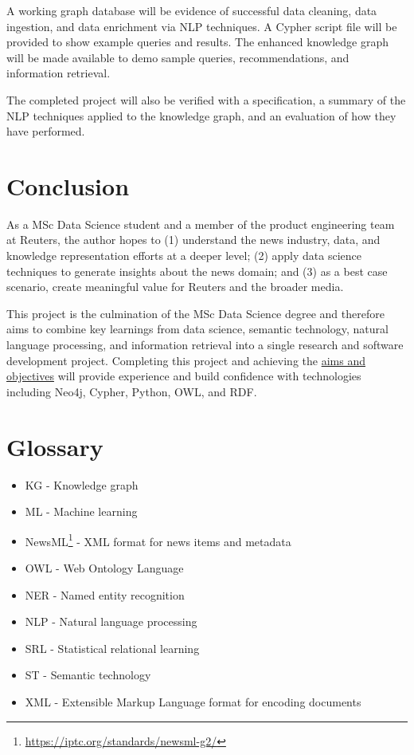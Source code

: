 \documentclass[11pt]{article}
\begin{document}
A working graph database will be evidence of successful data cleaning, data ingestion, and data enrichment via NLP techniques. A Cypher script file will be provided to show example queries and results. The enhanced knowledge graph will be made available to demo sample queries, recommendations, and information retrieval.

The completed project will also be verified with a specification, a summary of the NLP techniques applied to the knowledge graph, and an evaluation of how they have performed.

\newpage
\section{Conclusion}

As a MSc Data Science student and a member of the product engineering team at Reuters, the author hopes to (1) understand the news industry, data, and knowledge representation efforts at a deeper level; (2) apply data science techniques to generate insights about the news domain; and (3) as a best case scenario, create meaningful value for Reuters and the broader media.

This project is the culmination of the MSc Data Science degree and therefore aims to combine key learnings from data science, semantic technology, natural language processing, and information retrieval into a single research and software development project. Completing this project and achieving the \hyperref[sec:AimsObjectives]{aims and objectives} will provide experience and build confidence with technologies including Neo4j, Cypher, Python, OWL, and RDF.

\newpage
\section{Glossary}
\begin{itemize}
\item KG - Knowledge graph
\item ML - Machine learning
\item NewsML\footnote{\url{https://iptc.org/standards/newsml-g2/}} - XML format for news items and metadata
\item OWL - Web Ontology Language
\item NER - Named entity recognition
\item NLP - Natural language processing
\item SRL - Statistical relational learning
\item ST - Semantic technology
\item XML - Extensible Markup Language format for encoding documents
\end{itemize}

\newpage


\end{document}
